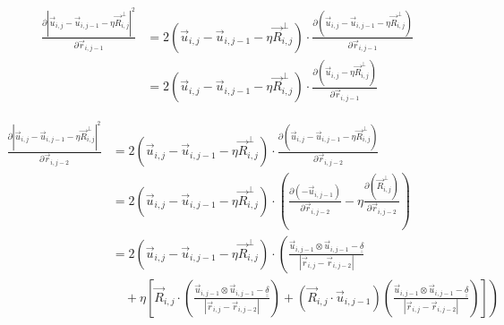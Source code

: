 \documentclass{article}
\renewcommand{\ij}{_{i,j}}
\newcommand{\ijj}{_{i,j-1}}
\newcommand{\ijjj}{_{i,j-2}}
\newcommand{\magn}[1]{\left\vert #1 \right\vert }
\renewcommand{\part}[2]{\frac{\partial #1 }{\partial #2}}
\newcommand{\ten}[1]{\underline{\underline{#1}}}
\newcommand{\rij}{\vec{r} \ij}
\newcommand{\Rij}{\vec{R} \ij}
\newcommand{\rijj}{\vec{r} \ijj}
\newcommand{\rijjj}{\vec{r} \ijjj}
\newcommand{\uij}{\vec{u} \ij}
\newcommand{\uijj}{\vec{u} \ijj}
\begin{document}
\begin{align*}
  \part{\magn{\uij - \uijj - \eta \Rij^\perp}^2 }{
    \rijj
  }
  &=
  2\left(\uij - \uijj - \eta \Rij^\perp\right) \cdot
  \part{\left(\uij - \uijj - \eta \Rij^\perp\right)}{\rijj}
  \\
  &=
  2\left(\uij - \uijj - \eta \Rij^\perp\right) \cdot
  \part{\left(\uij - \eta \Rij^\perp\right)}{\rijj}
\end{align*}


\begin{align*}
  \part{\magn{\uij - \uijj - \eta \Rij^\perp}^2 }{
    \rijjj
  }
  &=
  2\left(\uij - \uijj - \eta \Rij^\perp\right) \cdot
  \part{\left(\uij - \uijj - \eta \Rij^\perp\right)}{\rijjj}
  \\
  & =
  2\left(\uij - \uijj - \eta \Rij^\perp\right) \cdot
  \left(
  \part{ \left( - \uijj \right) }{\rijjj}
  -
  \eta 
  \part{\left( \Rij^\perp\right)}{\rijjj}
  \right)
  \\
  & =
  2\left(\uij - \uijj - \eta \Rij^\perp\right) 
  \cdot
  \left(
  \frac{\uijj \otimes \uijj - \ten{\delta} }{\magn{\rij - \rijjj}}
  \right. 
  \\
  &
  \quad 
  +
  \eta 
  \left.
  \left[
  \Rij \cdot 
  \left(
    \frac{\uijj \otimes \uijj - \ten{\delta}}{\magn{\rij - \rijjj}}
  \right)
  + 
  \left(
  \vec{R}\ij \cdot \vec{u} \ijj
  \right)
  {
  \left(
  \frac{\uijj \otimes \uijj - \ten{\delta} }{\magn{\rij - \rijjj}}
  \right)
  }
  \right]
  \right)
\end{align*}
\end{document}
